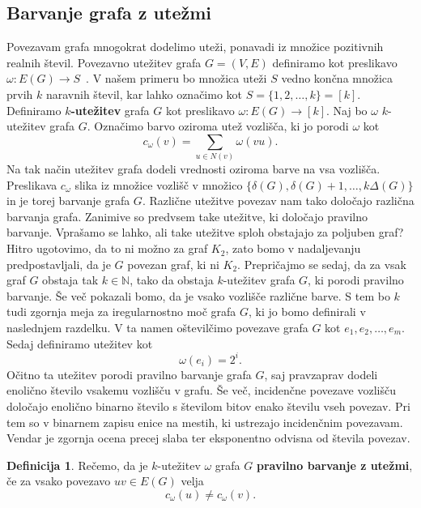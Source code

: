 \documentclass[12pt,a4paper,twoside]{article}
\theoremstyle{definition} %
\newtheorem{definicija}{Definicija}[section]
\theoremstyle{plain} %
\numberwithin{equation}{section}  %
\begin{document}
\subsection{Barvanje grafa z utežmi}


Povezavam grafa mnogokrat dodelimo uteži, ponavadi iz množice pozitivnih realnih števil. Povezavno utežitev grafa $G=(V,E)$ definiramo kot preslikavo  $\omega : E(G) \rightarrow S$~. V našem primeru bo množica uteži $S$ vedno končna množica prvih $k$ naravnih števil, kar lahko označimo kot $S = \{1,2, \ldots, k\}= \left[k\right] $. Definiramo \textbf{$k$-utežitev} grafa $G$ kot preslikavo  $ \omega : E(G)  \rightarrow \left[k\right]$.
Naj bo $\omega$ $k$-utežitev grafa $G$. Označimo barvo oziroma utež vozlišča, ki jo porodi $\omega$ kot
$$ c_{\omega} (v) = \sum_{u \in N(v)} \omega(vu). $$
Na tak način utežitev grafa dodeli vrednosti oziroma barve na vsa vozlišča. Preslikava $c_{\omega}$ slika iz množice vozlišč v množico $\{ \delta(G),\delta(G) + 1, \ldots, k \Delta(G)\}$ in je torej barvanje grafa $G$.
Različne utežitve povezav nam tako določajo različna barvanja grafa. Zanimive so predvsem take utežitve, ki določajo pravilno barvanje. Vprašamo se lahko, ali take utežitve sploh obstajajo za poljuben graf? Hitro ugotovimo, da to ni možno za graf $K_2$, zato bomo v nadaljevanju predpostavljali, da je $G$ povezan graf, ki ni $K_2$. Prepričajmo se sedaj, da za vsak graf $G$ obstaja tak $k \in \mathbb{N}$, tako da obstaja $k$-utežitev grafa $G$, ki porodi pravilno barvanje. Še več pokazali bomo, da je vsako vozlišče različne barve. S tem bo $k$ tudi zgornja meja za iregularnostno moč grafa $G$, ki jo bomo definirali v naslednjem razdelku. V ta namen oštevilčimo povezave grafa $G$ kot $e_1, e_2, \ldots, e_m$. Sedaj definiramo utežitev kot 
$$\omega(e_i) = 2 ^i .$$
Očitno ta utežitev porodi pravilno barvanje grafa $G$, saj pravzaprav dodeli enolično število vsakemu vozlišču v grafu. Še več, incidenčne povezave vozlišču določajo enolično binarno število s številom bitov enako številu vseh povezav. Pri tem so v binarnem zapisu enice na mestih, ki ustrezajo incidenčnim povezavam. Vendar je zgornja ocena precej slaba ter eksponentno odvisna od števila povezav.
\begin{definicija}
	Rečemo, da je $k$-utežitev $\omega$ grafa $G$  \textbf{pravilno barvanje z utežmi}, če za vsako povezavo $uv \in E(G)$ velja
	$$c_{\omega} (u) \neq c_{\omega}(v). $$
\end{definicija}
\end{document}
